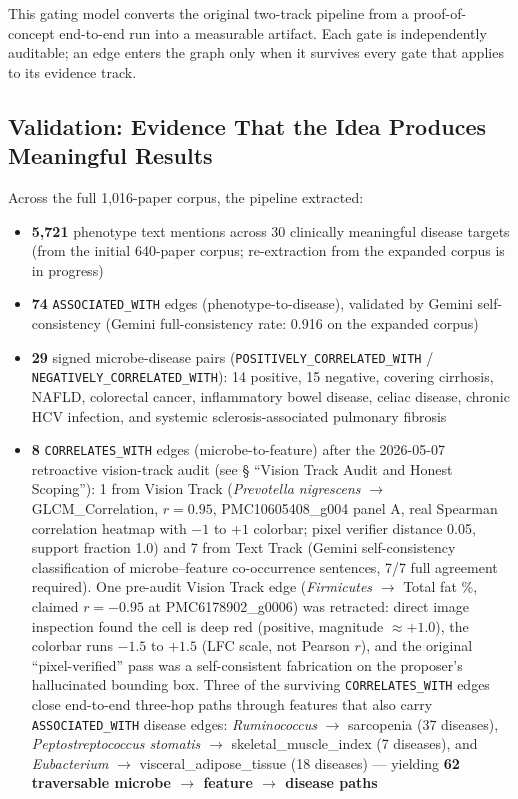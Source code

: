 \documentclass[12pt, letterpaper]{article}
\begin{document}
This gating model converts the original two-track pipeline from a proof-of-concept end-to-end run into a measurable artifact. Each gate is independently auditable; an edge enters the graph only when it survives every gate that applies to its evidence track.

\subsection{Validation: Evidence That the Idea Produces Meaningful Results}

Across the full 1,016-paper corpus, the pipeline extracted:

\begin{itemize}
    \item \textbf{5,721} phenotype text mentions across 30 clinically meaningful disease targets (from the initial 640-paper corpus; re-extraction from the expanded corpus is in progress)
    \item \textbf{74} \texttt{ASSOCIATED\_WITH} edges (phenotype-to-disease), validated by Gemini self-consistency (Gemini full-consistency rate: 0.916 on the expanded corpus)
    \item \textbf{29} signed microbe-disease pairs (\texttt{POSITIVELY\_CORRELATED\_WITH} / \texttt{NEGATIVELY\_CORRELATED\_WITH}): 14 positive, 15 negative, covering cirrhosis, NAFLD, colorectal cancer, inflammatory bowel disease, celiac disease, chronic HCV infection, and systemic sclerosis-associated pulmonary fibrosis
    \item \textbf{8} \texttt{CORRELATES\_WITH} edges (microbe-to-feature) after the 2026-05-07 retroactive vision-track audit (see § ``Vision Track Audit and Honest Scoping''): 1 from Vision Track (\textit{Prevotella nigrescens} $\to$ GLCM\_Correlation, $r=0.95$, PMC10605408\_g004 panel A, real Spearman correlation heatmap with $-1$ to $+1$ colorbar; pixel verifier distance 0.05, support fraction 1.0) and 7 from Text Track (Gemini self-consistency classification of microbe--feature co-occurrence sentences, 7/7 full agreement required). One pre-audit Vision Track edge (\textit{Firmicutes} $\to$ Total fat \%, claimed $r=-0.95$ at PMC6178902\_g0006) was retracted: direct image inspection found the cell is deep red (positive, magnitude $\approx +1.0$), the colorbar runs $-1.5$ to $+1.5$ (LFC scale, not Pearson $r$), and the original ``pixel-verified'' pass was a self-consistent fabrication on the proposer's hallucinated bounding box. Three of the surviving \texttt{CORRELATES\_WITH} edges close end-to-end three-hop paths through features that also carry \texttt{ASSOCIATED\_WITH} disease edges: \textit{Ruminococcus} $\to$ sarcopenia (37 diseases), \textit{Peptostreptococcus stomatis} $\to$ skeletal\_muscle\_index (7 diseases), and \textit{Eubacterium} $\to$ visceral\_adipose\_tissue (18 diseases) --- yielding \textbf{62 traversable microbe $\to$ feature $\to$ disease paths}

\end{itemize}
\end{document}
